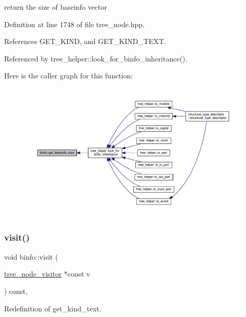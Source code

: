 return the size of baseinfo vector 



Definition at line 1748 of file tree\+\_\+node.\+hpp.



References G\+E\+T\+\_\+\+K\+I\+ND, and G\+E\+T\+\_\+\+K\+I\+N\+D\+\_\+\+T\+E\+XT.



Referenced by tree\+\_\+helper\+::look\+\_\+for\+\_\+binfo\+\_\+inheritance().

Here is the caller graph for this function\+:
\nopagebreak
\begin{figure}[H]
\begin{center}
\leavevmode
\includegraphics[width=350pt]{d2/db5/structbinfo_ac48ab2cc024529097997704729acccb3_icgraph}
\end{center}
\end{figure}
\mbox{\label{structbinfo_adc2b24cc31b9f03ae787f9f625405883}} 
\subsubsection{\texorpdfstring{visit()}{visit()}}
{\footnotesize\ttfamily void binfo\+::visit (\begin{DoxyParamCaption}\item[{\hyperlink{classtree__node__visitor}{tree\+\_\+node\+\_\+visitor} $\ast$const}]{v }\end{DoxyParamCaption}) const\hspace{0.3cm}{\ttfamily [override]}, {\ttfamily [virtual]}}



Redefinition of get\+\_\+kind\+\_\+text. 

